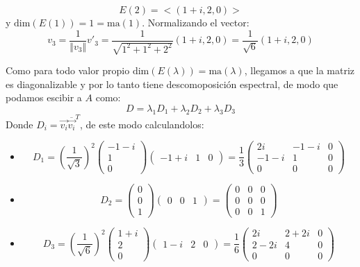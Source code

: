 \begin{itemize}
\begin{itemize}
        
        \[E(2)=<(1+i,2,0)>\]
        y $\text{dim}(E(1))=1=\text{ma}(1)$. 
        Normalizando el vector:
        \[v_3=\frac{1}{\Vert v_3\Vert}v'_3=\frac{1}{\sqrt{1^2+1^2+2^2}}(1+i,2,0)=\frac{1}{\sqrt{6}}(1+i,2,0)\]
    
        
    \end{itemize}
    Como para todo valor propio $\text{dim}(E(\lambda))=\text{ma}(\lambda)$, llegamos a que la matriz es diagonalizable y por lo tanto tiene descomoposici\'on espectral, de modo que podamos escibir a $A$ como:
    \[D=\lambda_1D_1+\lambda_2D_2+\lambda_3D_3\]
    Donde $D_i=\vec{v_i}\overline{\vec{v_i}}^T$, de este modo calculandolos:
    \begin{itemize}
        \item \[D_1=\left(\frac{1}{\sqrt{3}}\right)^2\begin{pmatrix}-1-i\\1\\0\end{pmatrix}\begin{pmatrix}-1+i&1&0\end{pmatrix}=\frac{1}{3}\begin{pmatrix}2i&-1-i&0\\-1-i&1&0\\0&0&0\end{pmatrix}\]
        \item \[D_2=\begin{pmatrix}0\\0\\1\end{pmatrix}\begin{pmatrix}0&0&1\end{pmatrix}=\begin{pmatrix}0&0&0\\0&0&0\\0&0&1\end{pmatrix}\]
        \item \[D_3=\left(\frac{1}{\sqrt{6}}\right)^2\begin{pmatrix}1+i\\2\\0\end{pmatrix}\begin{pmatrix}1-i&2&0\end{pmatrix}=\frac{1}{6}\begin{pmatrix}2i&2+2i&0\\2-2i&4&0\\0&0&0\end{pmatrix}\]
        

\end{itemize}
\end{itemize}
